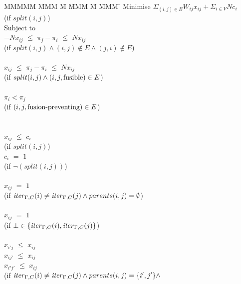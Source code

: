 \begin{tabbing}
MMMMM   \= MMM \= M \= MMM \= M \= MMM \= \kill
Minimise   \> $\Sigma_{(i,j) \in E} W_{ij} x_{ij} + \Sigma_{i \in V} N c_i$  \\
           \> (if $split(i,j)$)         \\
Subject to \\
           \> $-N x_{ij}$ \> $\le$ \> $\pi_j - \pi_i$ \> $\le$ \> $N x_{ij}$ \\
           \> (if $split(i,j) \wedge (i,j) \not\in E \wedge (j,i) \not\in E$)            \\
\\
           \>    $x_{ij}$ \> $\le$ \> $\pi_j - \pi_i$ \> $\le$ \> $N x_{ij}$ \\
           \> (if $split(i,j) \wedge (i,j,\mathrm{fusible}) \in E$)     \\
\\
           \>             \>       \> $\pi_i < \pi_j$ \>       \>            \\
           \> (if $(i,j,\mbox{fusion-preventing}) \in E$)    \\
\\
\\
           \> $x_{ij}$    \> $\le$ \> $c_i$           \>       \>            \\
           \> (if $split(i,j)$) \\
           \> $c_{i }$    \> $ = $ \> $ 1 $           \>       \>            \\
           \> (if $\neg(split(i,j))$) \\
\\
           \> $x_{ij}$    \> $=$   \> $1$             \>       \>            \\
           \> (if $\mathit{iter}_{\Gamma,C}(i) \not= \mathit{iter}_{\Gamma,C}(j) \wedge parents(i,j) = \emptyset$)  \\
           \\
           \> $x_{ij}$    \> $=$   \> $1$             \>       \>            \\
           \> (if $\bot \in \{\mathit{iter}_{\Gamma,C}(i), \mathit{iter}_{\Gamma,C}(j)\}$)  \\
           \\
           \> $x_{i'j}$   \> $\le$ \> $x_{ij}$        \>       \>            \\
           \> $x_{ij'}$   \> $\le$ \> $x_{ij}$        \>       \>            \\
           \> $x_{i'j'}$   \> $\le$ \> $x_{ij}$        \>       \>            \\
           \> (if $\mathit{iter}_{\Gamma,C}(i) \not= \mathit{iter}_{\Gamma,C}(j) \wedge parents(i,j) = \{i',j'\} \wedge$ \\


\end{tabbing}
